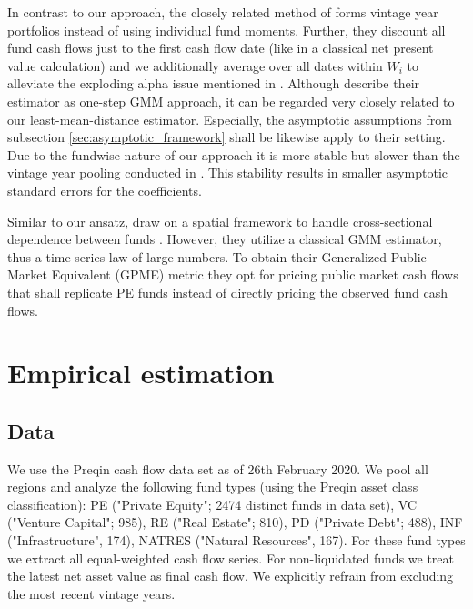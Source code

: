 \documentclass[12pt]{article}
\begin{document}
In contrast to our approach, the closely related method of \cite{DLP12} forms vintage year portfolios instead of using individual fund moments.
Further, they discount all fund cash flows just to the first cash flow date (like in a classical net present value calculation) and we additionally average over all dates within $W_{i}$ to alleviate the exploding alpha issue mentioned in \cite{DLP12}.
Although \cite{DLP12} describe their estimator as one-step GMM approach, it can be regarded very closely related to our least-mean-distance estimator.
Especially, the asymptotic assumptions from subsection \ref{sec:asymptotic_framework} shall be likewise apply to their setting.
Due to the fundwise nature of our approach it is more stable but slower than the vintage year pooling conducted in \cite{DLP12}.
This stability results in smaller asymptotic standard errors for the coefficients.

Similar to our ansatz, \cite{KN16} draw on a spatial framework to handle cross-sectional dependence between funds \citep{C99}.
However, they utilize a classical GMM estimator, thus a time-series law of large numbers.
To obtain their Generalized Public Market Equivalent (GPME) metric they opt for pricing public market cash flows that shall replicate PE funds instead of directly pricing the observed fund cash flows.


\section{Empirical estimation}

\subsection{Data}

We use the Preqin cash flow data set as of 26th February 2020.
We pool all regions and analyze the following fund types (using the Preqin asset class classification):
PE ("Private Equity"; 2474 distinct funds in data set),
VC ("Venture Capital"; 985),
RE ("Real Estate"; 810),
PD ("Private Debt"; 488),
INF ("Infrastructure", 174), 
NATRES ("Natural Resources", 167).
For these fund types we extract all equal-weighted cash flow series.
For non-liquidated funds we treat the latest net asset value as final cash flow.
We explicitly refrain from excluding the most recent vintage years.
\end{document}
